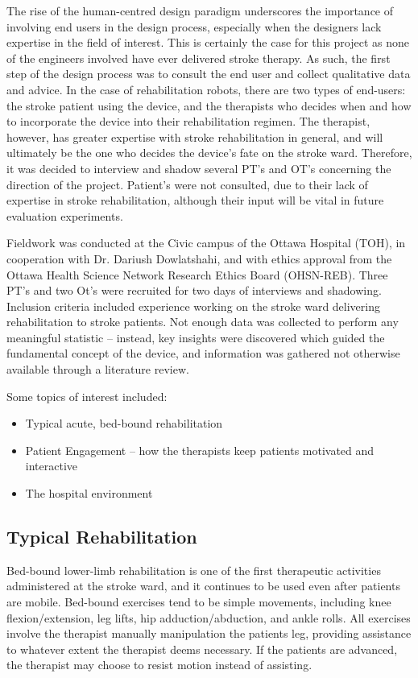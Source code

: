 \documentclass[12pt]{report}
\begin{document}
	The rise of the human-centred design paradigm underscores the importance of involving end users in the design process, especially when the designers lack expertise in the field of interest. This is certainly the case for this project as none of the engineers involved have ever delivered stroke therapy. As such, the first step of the design process was to consult the end user and collect qualitative data and advice. In the case of rehabilitation robots, there are two types of end-users: the stroke patient using the device, and the therapists who decides when and how to incorporate the device into their rehabilitation regimen. The therapist, however, has greater expertise with stroke rehabilitation in general, and will ultimately be the one who decides the device's fate on the stroke ward. Therefore, it was decided to interview and shadow several PT's and OT's concerning the direction of the project. Patient's were not consulted, due to their lack of expertise in stroke rehabilitation, although their input will be vital in future evaluation experiments. 
	
	Fieldwork was conducted at the Civic campus of the Ottawa Hospital (TOH), in cooperation with Dr. Dariush Dowlatshahi, and with ethics approval from the Ottawa Health Science Network Research Ethics Board (OHSN-REB). Three PT's and two Ot's were recruited for two days of interviews and shadowing. Inclusion criteria included experience working on the stroke ward delivering rehabilitation to stroke patients. Not enough data was collected to perform any meaningful statistic -- instead, key insights were discovered which guided the fundamental concept of the device, and information was gathered not otherwise available through a literature review. 
	
	Some topics of interest included:
	
	\begin{itemize}
		\item Typical acute, bed-bound rehabilitation 
		\item Patient Engagement -- how the therapists keep patients motivated and interactive
		\item The hospital environment 
	\end{itemize}

	
	\subsection{Typical Rehabilitation}
	
	Bed-bound lower-limb rehabilitation is one of the first therapeutic activities administered at the stroke ward, and it continues to be used even after patients are mobile. Bed-bound exercises tend to be simple movements, including knee flexion/extension, leg lifts, hip adduction/abduction, and ankle rolls. All exercises involve the therapist manually manipulation the patients leg, providing assistance to whatever extent the therapist deems necessary. If the patients are advanced, the therapist may choose to resist motion instead of assisting. 
	
\end{document}
